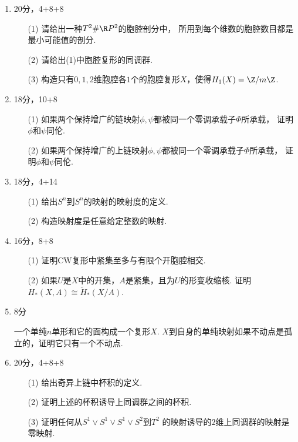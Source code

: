 \begin{enumerate}
    \item 20分，4+8+8
    \begin{itemize}
        \item[(1)]请给出一种$T^2\#\R P^2$的胞腔剖分中，
        所用到每个维数的胞腔数目都是最小可能值的剖分.
        \item[(2)]请给出(1)中胞腔复形的同调群.
        \item[(3)]构造只有$0,1,2$维胞腔各$1$个的胞腔复形$X$，使得$H_1(X)=\Z/m\Z$.
    \end{itemize}
    \item 18分，10+8
    \begin{itemize}
        \item[(1)]如果两个保持增广的链映射$\phi,\psi$都被同一个零调承载子$\Phi$所承载，
        证明$\phi$和$\psi$同伦.
        \item[(2)]如果两个保持增广的上链映射$\phi,\psi$都被同一个零调承载子$\Phi$所承载，
        证明$\phi$和$\psi$同伦.
    \end{itemize}
    \item 18分，4+14
    \begin{itemize}
        \item[(1)]给出$S^n$到$S^n$的映射的映射度的定义.
        \item[(2)]构造映射度是任意给定整数的映射.
    \end{itemize}
    \item 16分，8+8
    \begin{itemize}
        \item[(1)]证明CW复形中紧集至多与有限个开胞腔相交.
        \item[(2)]如果$U$是$X$中的开集，$A$是紧集，且为$U$的形变收缩核.
        证明$H_*(X,A)\cong\tilde{H}_*(X/A)$.
    \end{itemize}
    \item 8分
    
    一个单纯$n$单形和它的面构成一个复形$X$.
    $X$到自身的单纯映射如果不动点是孤立的，证明它只有一个不动点.
    \item 20分，4+8+8
    \begin{itemize}
        \item[(1)]给出奇异上链中杯积的定义.
        \item[(2)]证明上述的杯积诱导上同调群之间的杯积.
        \item[(3)]证明任何从$S^1\vee S^1\vee S^1\vee S^2$到$T^2$
        的映射诱导的$2$维上同调群的映射是零映射.
    \end{itemize}
\end{enumerate}


